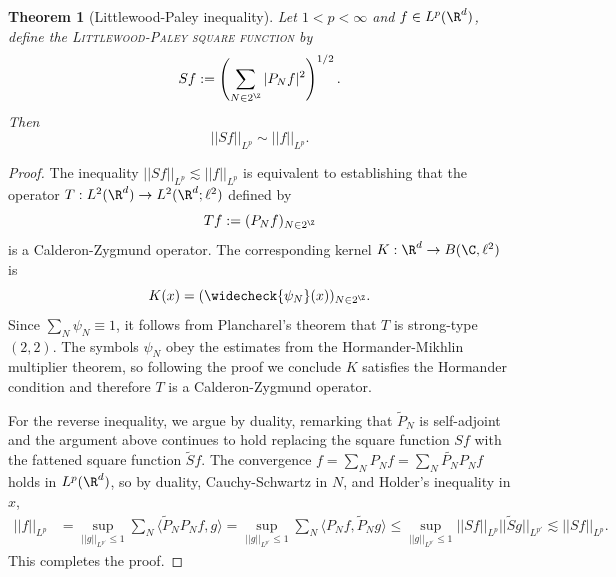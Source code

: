 \documentclass[reqno]{amsart}
\newtheorem{theorem}{Theorem}
\theoremstyle{definition}
\theoremstyle{remark}
\renewcommand{\emph}{\textsc}
\begin{document}
\begin{theorem}[Littlewood-Paley inequality]
	Let $1 < p < \infty$ and $f \in L^p (\R^d)$, define the \emph{Littlewood-Paley square function} by 
	\[ Sf := \left( \sum_{N \in 2^\Z} |P_N f|^2 \right)^{1/2}. \]
	Then 
		\[ ||S f||_{L^p} \sim ||f||_{L^p}. \]
\end{theorem}

\begin{proof}
	The inequality $||Sf||_{L^p} \lesssim ||f||_{L^p}$ is equivalent to establishing that the operator $T: L^2 (\R^d) \to L^2 (\R^d ; \ell^2)$ defined by 
		\[ Tf := ( P_N f )_{N \in 2^\Z}  \]
	is a Calderon-Zygmund operator. The corresponding kernel $K: \R^d \to B(\C, \ell^2)$ is
		\[ K(x) = (\widecheck{\psi_N} (x))_{N \in 2^\Z}. \]
	Since $\sum_N \psi_N \equiv 1$, it follows from Plancharel's theorem that $T$ is strong-type $(2, 2)$. The symbols $\psi_N$ obey the estimates from the Hormander-Mikhlin multiplier theorem, so following the proof we conclude $K$ satisfies the Hormander condition and therefore $T$ is a Calderon-Zygmund operator. 
	
	For the reverse inequality, we argue by duality, remarking that $\widetilde P_N$ is self-adjoint and the argument above continues to hold replacing the square function $Sf$ with the fattened square function $\widetilde S f$. The convergence $f = \sum_N P_N f = \sum_N \widetilde{P_N} P_N f$ holds in $L^p (\R^d)$, so by duality, Cauchy-Schwartz in $N$, and Holder's inequality in $x$, 
		\begin{align*}
			||f||_{L^p}
				&=\sup_{||g||_{L^{p'}  } \leq 1} \sum_N\langle  \widetilde P_N P_N f, g \rangle = \sup_{||g||_{L^{p'}  } \leq 1} \sum_N \langle P_N f, \widetilde P_N  g \rangle \leq \sup_{||g||_{L^{p'}  } \leq 1} ||S f||_{L^p} ||\widetilde S g||_{L^{p'}} \lesssim ||Sf||_{L^p}.
		\end{align*}
	This completes the proof. 	
\end{proof}



\end{document}
